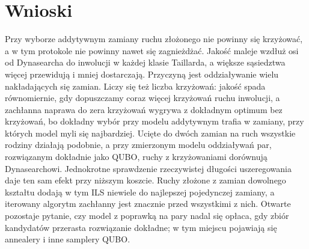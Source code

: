\documentclass[10pt,twocolumn]{article}
\begin{document}
\section{Wnioski}
Przy wyborze addytywnym zamiany ruchu złożonego nie powinny się
krzyżować, a w tym protokole nie powinny nawet się zagnieżdżać. Jakość
maleje wzdłuż osi od Dynasearcha do inwolucji w każdej klasie Taillarda,
a większe sąsiedztwa więcej przewidują i mniej dostarczają. Przyczyną
jest oddziaływanie wielu nakładających się zamian. Liczy się też liczba
krzyżowań: jakość spada równomiernie, gdy dopuszczamy coraz więcej
krzyżowań ruchu inwolucji, a zachłanna naprawa do zera krzyżowań wygrywa
z dokładnym optimum bez krzyżowań, bo dokładny wybór przy modelu
addytywnym trafia w zamiany, przy których model myli się najbardziej. Ucięte do dwóch zamian
na ruch wszystkie rodziny działają podobnie, a przy zmierzonym modelu
oddziaływań par, rozwiązanym dokładnie jako QUBO, ruchy z krzyżowaniami
dorównują Dynasearchowi. Jednokrotne sprawdzenie rzeczywistej długości
uszeregowania daje ten sam efekt przy niższym koszcie. Ruchy złożone
z zamian dowolnego kształtu dodają w tym ILS niewiele do najlepszej
pojedynczej zamiany, a iterowany algorytm zachłanny jest znacznie przed
wszystkimi z nich. Otwarte pozostaje pytanie, czy model z poprawką na
pary nadal się opłaca, gdy zbiór kandydatów przerasta rozwiązanie
dokładne; w tym miejscu pojawiają się annealery i inne samplery QUBO.
\end{document}
